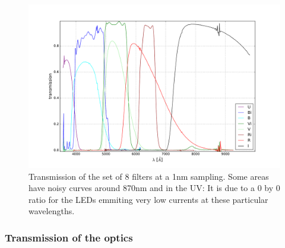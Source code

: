 \documentclass[\docopts]{\docclass}
\begin{document}
\begin{figure}[ht]
  \centering
  \includegraphics[width=0.7\linewidth]{filters_transmissions.pdf}
  \caption{Transmission of the set of 8 filters at a 1nm
    sampling. Some areas have noisy curves around 870nm and in the UV:
    It is due to a 0 by 0 ratio for the LEDs emmiting very low
    currents at these particular wavelengths.}
  \label{fig:filters_transmissions}
\end{figure}


\subsubsection{Transmission of the optics}
\label{sec:optics}
\end{document}
